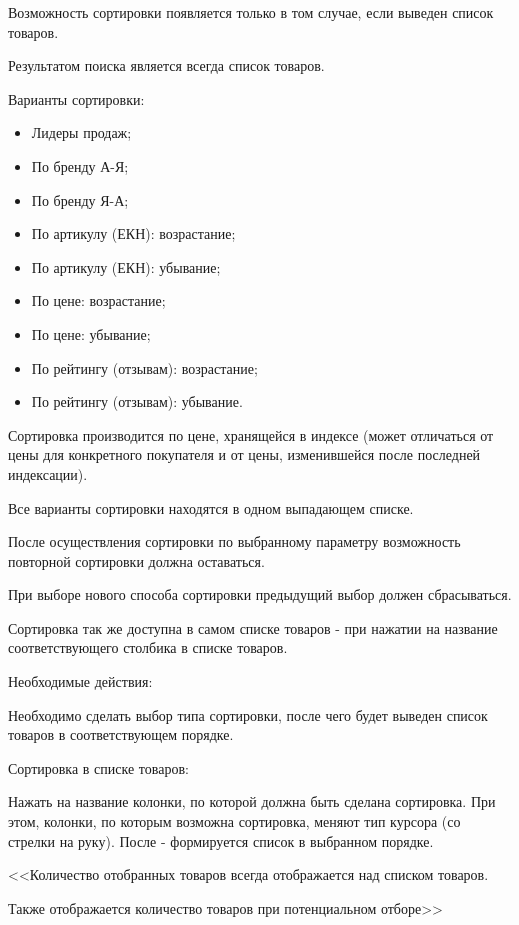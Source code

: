 {
Возможность сортировки появляется только в том случае, если выведен список товаров.

Результатом поиска является всегда список товаров. 

Варианты сортировки:
\begin{itemize}
\item Лидеры продаж;
\item По бренду А-Я;
\item По бренду Я-А;
\item По артикулу (ЕКН): возрастание;
\item По артикулу (ЕКН): убывание;
\item По цене: возрастание;
\item По цене: убывание;
\item По рейтингу (отзывам): возрастание;
\item По рейтингу (отзывам): убывание.
\end{itemize}

Сортировка производится по цене, хранящейся в индексе (может отличаться от цены для конкретного покупателя и от цены, изменившейся после последней индексации).

Все варианты сортировки находятся в одном выпадающем списке.

После осуществления сортировки по выбранному параметру возможность повторной сортировки должна оставаться.

При выборе нового способа сортировки предыдущий выбор должен сбрасываться.

Сортировка так же доступна в самом списке товаров - при нажатии на название соответствующего столбика в списке товаров.

Необходимые действия:

Необходимо сделать выбор типа сортировки, после чего будет выведен список товаров в соответствующем порядке.

Сортировка в списке товаров:

Нажать на название колонки, по которой должна быть сделана сортировка. При этом, колонки, по которым возможна сортировка, меняют тип курсора (со стрелки на руку). После - формируется список в выбранном порядке.
}
{
<<Количество отобранных товаров всегда отображается над списком товаров.
 
Также отображается количество товаров при потенциальном отборе>>
}
